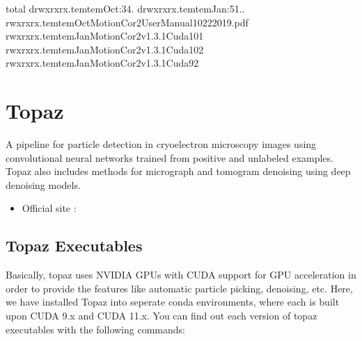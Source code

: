 \documentclass[a4paper,11pt,english]{sphinxmanual}
\begin{document}
\begin{sphinxVerbatim}[commandchars=\\\{\}]
total
drwxr\PYGZhy{}xr\PYGZhy{}x.temtemOct:34.
drwxr\PYGZhy{}xr\PYGZhy{}x.temtemJan:51..
\PYGZhy{}rwxr\PYGZhy{}xr\PYGZhy{}x.temtemOctMotionCor2\PYGZhy{}UserManual\PYGZhy{}10\PYGZhy{}22\PYGZhy{}2019.pdf
\PYGZhy{}rwxr\PYGZhy{}xr\PYGZhy{}x.temtemJanMotionCor2\PYGZus{}v1.3.1\PYGZhy{}Cuda101
\PYGZhy{}rwxr\PYGZhy{}xr\PYGZhy{}x.temtemJanMotionCor2\PYGZus{}v1.3.1\PYGZhy{}Cuda102
\PYGZhy{}rwxr\PYGZhy{}xr\PYGZhy{}x.temtemJanMotionCor2\PYGZus{}v1.3.1\PYGZhy{}Cuda92
\end{sphinxVerbatim}

\sphinxstepscope


\chapter{Topaz}
\label{\detokenize{topaz:topaz}}\label{\detokenize{topaz:id1}}\label{\detokenize{topaz::doc}}
\sphinxAtStartPar
A pipeline for particle detection in cryo\sphinxhyphen{}electron microscopy images using convolutional neural networks trained from positive and unlabeled examples.
Topaz also includes methods for micrograph and tomogram denoising using deep denoising models.
\begin{itemize}
\item {} 
\sphinxAtStartPar
Official  site : 

\end{itemize}


\section{Topaz Executables}
\label{\detokenize{topaz:topaz-executables}}
\sphinxAtStartPar
Basically, topaz uses NVIDIA GPUs with CUDA support for GPU acceleration in order to provide the features like automatic particle picking, denoising, etc.
Here, we have installed Topaz into seperate conda environments, where each is built upon CUDA 9.x and CUDA 11.x.
You can find out each version of topaz executables with the following commands:
\end{document}
